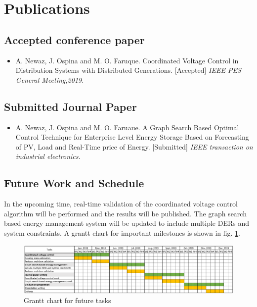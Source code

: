 

\section{Publications}
\subsection{Accepted conference paper}
\begin{itemize}
    \item A. Newaz, J. Ospina and M. O. Faruque. Coordinated Voltage Control in Distribution
Systems with Distributed Generations. [Accepted] \textit{IEEE PES General Meeting,2019}.
\end{itemize}


\subsection{Submitted Journal Paper}
\begin{itemize}
    \item A. Newaz, J. Ospina and M. O. Faruaue. A Graph Search Based Optimal Control Technique for Enterprise Level Energy Storage Based on Forecasting of PV, Load and Real-Time price of Energy. [Submitted] \textit{IEEE transaction on industrial electronics.}

\end{itemize}

\subsection{Future Work and Schedule}
In the upcoming time, real-time validation of the coordinated voltage control algorithm will be performed and the results will be published. The graph search based energy management system will be updated to include multiple DERs and system constraints. A grantt chart for important milestones is shown in fig. \ref{fig:GANTT}.

\begin{figure}[!ht]
    \centering
    \includegraphics[width = 1.3\linewidth, angle =270]{figs/GANTT.png}
    \caption{Grantt chart for future tasks}
    \label{fig:GANTT}
\end{figure}
